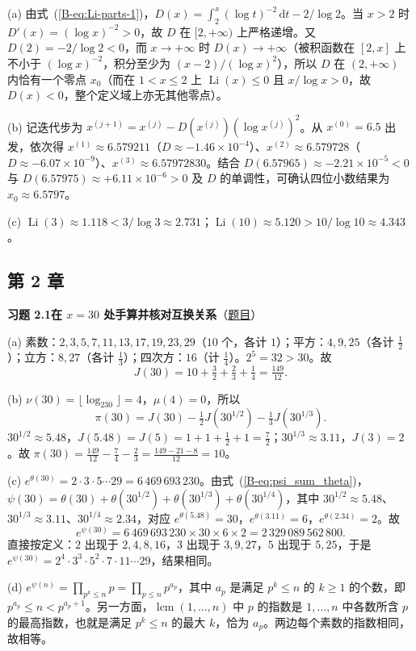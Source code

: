 \documentclass[11pt,a4paper]{article}
\DeclareMathOperator{\Li}{Li}
\newcommand{\dd}{\,\mathrm{d}}
\newcommand{\bref}[1]{\ref*{B-#1}}
\newcommand{\Sol}[2]{%
  \par\addvspace{1.2em}\noindent
  \hypertarget{s:#1}{}\textbf{习题 #1\quad #2}\hfill{\small（\hyperlink{q:#1}{题目}）}\par
  \nopagebreak\smallskip}
\begin{document}
(a) 由式~(\bref{eq:Li-parts-1})，$D(x)=\int_2^x(\log t)^{-2}\dd t-2/\log2$。当 $x>2$ 时 $D'(x)=(\log x)^{-2}>0$，故 $D$ 在 $[2,+\infty)$ 上严格递增。又 $D(2)=-2/\log2<0$，而 $x\to+\infty$ 时 $D(x)\to+\infty$（被积函数在 $[2,x]$ 上不小于 $(\log x)^{-2}$，积分至少为 $(x-2)/(\log x)^2$），所以 $D$ 在 $(2,+\infty)$ 内恰有一个零点 $x_0$（而在 $1<x\le2$ 上 $\Li(x)\le0$ 且 $x/\log x>0$，故 $D(x)<0$，整个定义域上亦无其他零点）。

(b) 记迭代步为 $x^{(j+1)}=x^{(j)}-D(x^{(j)})(\log x^{(j)})^2$。从 $x^{(0)}=6.5$ 出发，依次得 $x^{(1)}\approx6.579211$（$D\approx-1.46\times10^{-4}$）、$x^{(2)}\approx6.579728$（$D\approx-6.07\times10^{-9}$）、$x^{(3)}\approx6.57972830$。结合 $D(6.57965)\approx-2.21\times10^{-5}<0$ 与 $D(6.57975)\approx+6.11\times10^{-6}>0$ 及 $D$ 的单调性，可确认四位小数结果为 $x_0\approx6.5797$。

(c) $\Li(3)\approx1.118<3/\log3\approx2.731$；$\Li(10)\approx5.120>10/\log10\approx4.343$。

\subsection*{第 2 章}

\Sol{2.1}{在 $x=30$ 处手算并核对互换关系}
(a) 素数：$2,3,5,7,11,13,17,19,23,29$（$10$ 个，各计 $1$）；平方：$4,9,25$（各计 $\tfrac12$）；立方：$8,27$（各计 $\tfrac13$）；四次方：$16$（计 $\tfrac14$）。$2^5=32>30$。故
\[
  J(30)=10+\tfrac32+\tfrac23+\tfrac14=\tfrac{149}{12}.
\]

(b) $\nu(30)=\lfloor\log_230\rfloor=4$，$\mu(4)=0$，所以
\[
  \pi(30)=J(30)-\tfrac12J(30^{1/2})-\tfrac13J(30^{1/3}).
\]
$30^{1/2}\approx5.48$，$J(5.48)=J(5)=1+1+\tfrac12+1=\tfrac72$；$30^{1/3}\approx3.11$，$J(3)=2$。故
$\pi(30)=\tfrac{149}{12}-\tfrac74-\tfrac23=\tfrac{149-21-8}{12}=10$。

(c) $e^{\theta(30)}=2\cdot3\cdot5\cdots29=6\,469\,693\,230$。由式~(\bref{eq:psi_sum_theta})，$\psi(30)=\theta(30)+\theta(30^{1/2})+\theta(30^{1/3})+\theta(30^{1/4})$，其中 $30^{1/2}\approx5.48$、$30^{1/3}\approx3.11$、$30^{1/4}\approx2.34$，对应 $e^{\theta(5.48)}=30$，$e^{\theta(3.11)}=6$，$e^{\theta(2.34)}=2$。故
\[
  e^{\psi(30)}=6\,469\,693\,230\times30\times6\times2=2\,329\,089\,562\,800 .
\]
直接按定义：$2$ 出现于 $2,4,8,16$，$3$ 出现于 $3,9,27$，$5$ 出现于 $5,25$，于是 $e^{\psi(30)}=2^4\cdot3^3\cdot5^2\cdot7\cdot11\cdots29$，结果相同。

(d) $e^{\psi(n)}=\prod_{p^k\le n}p=\prod_{p\le n}p^{a_p}$，其中 $a_p$ 是满足 $p^k\le n$ 的 $k\ge1$ 的个数，即 $p^{a_p}\le n<p^{a_p+1}$。另一方面，$\operatorname{lcm}(1,\dots,n)$ 中 $p$ 的指数是 $1,\dots,n$ 中各数所含 $p$ 的最高指数，也就是满足 $p^k\le n$ 的最大 $k$，恰为 $a_p$。两边每个素数的指数相同，故相等。
\end{document}
